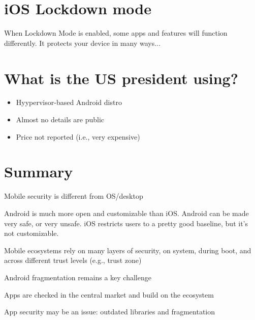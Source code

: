 \documentclass[11pt]{article}
\begin{document}
\section*{iOS Lockdown mode}

When Lockdown Mode is enabled, some apps and features will function differently. It protects your device in many ways...

\section*{What is the US president using?}
\begin{itemize}
	\item Hyypervisor-based Android distro
	\item Almost no details are public
	\item Price not reported (i.e., very expensive)
\end{itemize}

\section*{Summary}

Mobile security is different from OS/desktop

Android is much more open and customizable than iOS. Android can be made very safe, or very unsafe. iOS restricts users to a pretty good baseline, but it's not customizable. 

Mobile ecosystems rely on many layers of security, on system, during boot, and across different trust levels (e.g., trust zone)

Android fragmentation remains a key challenge 

Apps are checked in the central market and build on the ecosystem

App security may be an issue: outdated libraries and fragmentation
\end{document}
